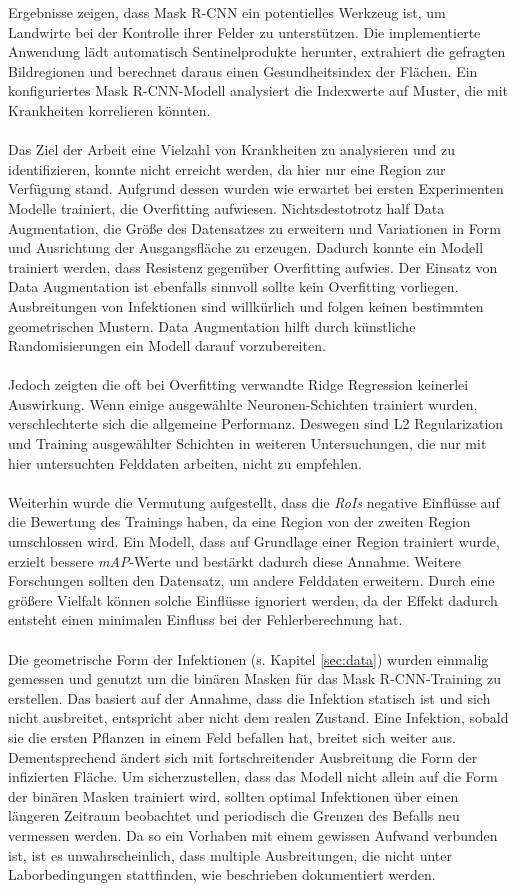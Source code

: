 Ergebnisse zeigen, dass Mask R-CNN ein potentielles Werkzeug ist, um Landwirte bei der Kontrolle ihrer Felder zu unterstützen. Die implementierte Anwendung lädt automatisch Sentinelprodukte herunter, extrahiert die gefragten Bildregionen und berechnet daraus einen Gesundheitsindex der Flächen. Ein konfiguriertes Mask R-CNN-Modell analysiert die Indexwerte auf Muster, die mit Krankheiten korrelieren könnten. 
\\\\
Das Ziel der Arbeit eine Vielzahl von Krankheiten zu analysieren und zu identifizieren, konnte nicht erreicht werden, da hier nur eine Region zur Verfügung stand. Aufgrund dessen wurden wie erwartet bei ersten Experimenten Modelle trainiert, die Overfitting aufwiesen. Nichtsdestotrotz half Data Augmentation, die Größe des Datensatzes zu erweitern und Variationen in Form und Ausrichtung der Ausgangsfläche zu erzeugen. Dadurch konnte ein Modell trainiert werden, dass Resistenz gegenüber Overfitting aufwies. Der Einsatz von Data Augmentation ist ebenfalls sinnvoll sollte kein Overfitting vorliegen. Ausbreitungen von Infektionen sind willkürlich und folgen keinen bestimmten geometrischen Mustern. Data Augmentation hilft durch künstliche Randomisierungen ein Modell darauf vorzubereiten.
\\\\
Jedoch zeigten die oft bei Overfitting verwandte Ridge Regression keinerlei Auswirkung. Wenn einige ausgewählte Neuronen-Schichten trainiert wurden, verschlechterte sich die allgemeine Performanz. Deswegen sind L2 Regularization und Training ausgewählter Schichten in weiteren Untersuchungen, die nur mit hier untersuchten Felddaten arbeiten, nicht zu empfehlen. 
\\\\
Weiterhin wurde die Vermutung aufgestellt, dass die \textit{RoIs} negative Einflüsse auf die Bewertung des Trainings haben, da eine Region von der zweiten Region umschlossen wird. Ein Modell, dass auf Grundlage einer Region trainiert wurde, erzielt bessere \textit{mAP}-Werte und bestärkt dadurch diese Annahme. Weitere Forschungen sollten den Datensatz, um andere Felddaten erweitern. Durch eine größere Vielfalt können solche Einflüsse ignoriert werden, da der Effekt dadurch entsteht einen minimalen Einfluss bei der Fehlerberechnung hat. 
\\\\
Die geometrische Form der Infektionen (s. Kapitel \ref{sec:data}) wurden einmalig gemessen und genutzt um die binären Masken für das Mask R-CNN-Training zu erstellen. Das basiert auf der Annahme, dass die Infektion statisch ist und sich nicht ausbreitet, entspricht aber nicht dem realen Zustand. Eine Infektion, sobald sie die ersten Pflanzen in einem Feld befallen hat, breitet sich weiter aus. Dementsprechend ändert sich mit fortschreitender Ausbreitung die Form der infizierten Fläche. Um sicherzustellen, dass das Modell nicht allein auf die Form der binären Masken trainiert wird, sollten optimal Infektionen über einen längeren Zeitraum beobachtet und periodisch die Grenzen des Befalls neu vermessen werden. Da so ein Vorhaben mit einem gewissen Aufwand verbunden ist, ist es unwahrscheinlich, dass multiple Ausbreitungen, die nicht unter Laborbedingungen stattfinden, wie beschrieben dokumentiert werden.
